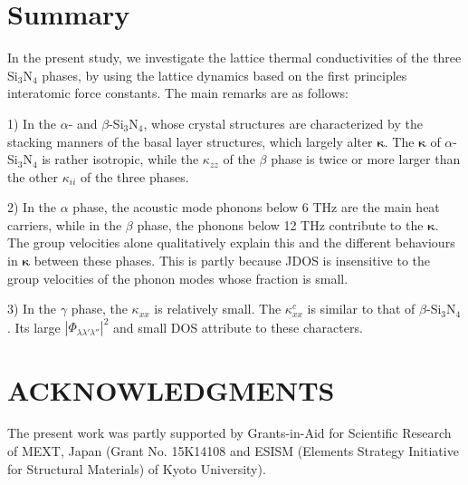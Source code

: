 \documentclass[twocolumn,amsmath,amssymb,a4paper,prb,superscriptaddress,floatfix]{revtex4-1}
\begin{document}
\section{Summary}

In the present study, we investigate the lattice thermal conductivities of the
three Si$_3$N$_4$ phases, by using the lattice dynamics based on the first
principles interatomic force constants. The main remarks are as follows:

1) In the $\alpha$- and $\beta$-Si$_3$N$_4$, whose crystal structures are
characterized by the stacking manners of the basal layer structures, which
largely alter $\boldsymbol{\kappa}$. The $\boldsymbol{\kappa}$ of
$\alpha$-Si$_3$N$_4$ is rather isotropic, while the $\kappa$$_{zz}$ of the
$\beta$ phase is twice or more larger than the other $\kappa_{ii}$ of the three
phases.

2) In the $\alpha$ phase, the acoustic mode phonons below 6 THz are the main
heat carriers, while in the $\beta$ phase, the phonons below 12 THz contribute
to the $\boldsymbol{\kappa}$. The group velocities alone qualitatively explain
this and the different behaviours in $\boldsymbol{\kappa}$ between these phases.
This is partly because JDOS is insensitive to the group velocities of the phonon
modes whose fraction is small.

3) In the $\gamma$ phase, the $\kappa_{xx}$ is relatively small. The
$\kappa^c_{xx}$ is similar to that of $\beta$-Si$_3$N$_4$. Its large
$|\Phi_{\lambda\lambda'\lambda''}|^2$
and small DOS attribute to these characters.

\section*{ACKNOWLEDGMENTS}
The present work was partly supported by Grants-in-Aid for Scientific
Research of MEXT, Japan (Grant No. 15K14108 and ESISM (Elements Strategy
Initiative for Structural Materials) of Kyoto University).

\appendix
\end{document}
